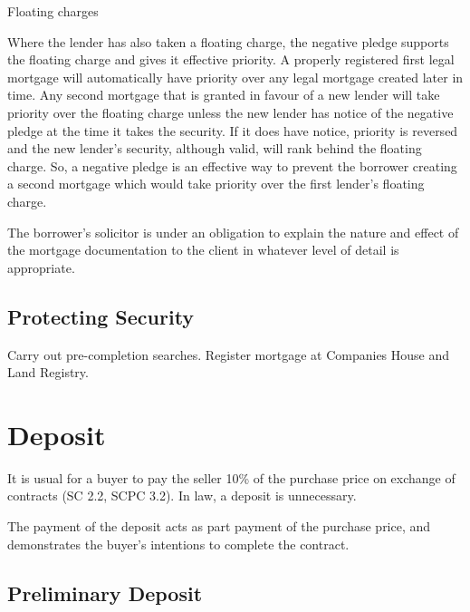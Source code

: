 \documentclass[
]{article}
\newenvironment{env-8e984a52-6a47-430d-9005-822950744b1a}
{
    \savenotes\tcolorbox[blanker,breakable,left=5pt,borderline west={2pt}{-4pt}{blue}]
}
{
    \endtcolorbox\spewnotes
}
\begin{document}
\begin{env-8e984a52-6a47-430d-9005-822950744b1a}

Floating charges

Where the lender has also taken a floating charge, the negative pledge
supports the floating charge and gives it effective priority. A properly
registered first legal mortgage will automatically have priority over
any legal mortgage created later in time. Any second mortgage that is
granted in favour of a new lender will take priority over the floating
charge unless the new lender has notice of the negative pledge at the
time it takes the security. If it does have notice, priority is reversed
and the new lender's security, although valid, will rank behind the
floating charge. So, a negative pledge is an effective way to prevent
the borrower creating a second mortgage which would take priority over
the first lender's floating charge.

\end{env-8e984a52-6a47-430d-9005-822950744b1a}

The borrower's solicitor is under an obligation to explain the nature
and effect of the mortgage documentation to the client in whatever level
of detail is appropriate.

\hypertarget{protecting-security}{%
\subsection{Protecting Security}\label{protecting-security}}

Carry out pre-completion searches. Register mortgage at Companies House
and Land Registry.

\hypertarget{deposit-1}{%
\section{Deposit}\label{deposit-1}}

It is usual for a buyer to pay the seller 10\% of the purchase price on
exchange of contracts (SC 2.2, SCPC 3.2). In law, a deposit is
unnecessary.

The payment of the deposit acts as part payment of the purchase price,
and demonstrates the buyer's intentions to complete the contract.

\hypertarget{preliminary-deposit}{%
\subsection{Preliminary Deposit}\label{preliminary-deposit}}
\end{document}
